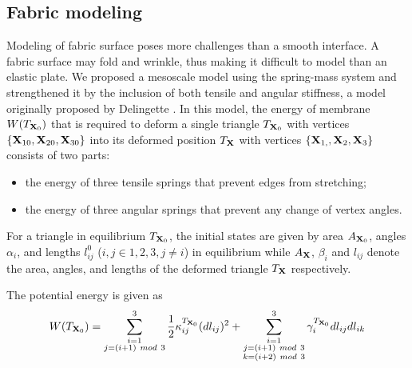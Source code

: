 \subsection{Fabric modeling} 
Modeling of fabric surface poses more challenges than
a smooth interface. A fabric surface may fold and wrinkle, thus making it
difficult to model than an elastic plate. We proposed a mesoscale model using
the spring-mass system and strengthened it by the inclusion of both tensile and
angular stiffness, a model originally proposed by Delingette \cite{Delinget2008}.
In this model, the energy of membrane $W(T_{\mathbf{X}_{0}})$ that is required to
deform a single triangle $T_{\mathbf{X}_{0}}$ with vertices
$\{\mathbf{X}_{10},\mathbf{X}_{20},\mathbf{X}_{30}\}$ into its deformed position
$T_{\mathbf{X}}$ with vertices $\{\mathbf{X}_{1,},\mathbf{X}_{2},\mathbf{X}_{3}\}$
consists of two parts: \begin{itemize} \item the energy of three tensile springs
that prevent edges from stretching; \item the energy of three angular springs
that prevent any change of vertex angles.  \end{itemize} For a triangle in
equilibrium $T_{\mathbf{X}_{0}}$, the initial states are given by area
$A_{\mathbf{X}_{0}}$, angles $\alpha_{i}$, and lengths $l_{ij}^{0}$
($i,j\in{1,2,3}, j\neq i$) in equilibrium while $A_{\mathbf{X}}$, $\beta_{i}$ and
$l_{ij}$ denote the area, angles, and lengths of the deformed triangle
$T_{\mathbf{X}}$ respectively.

The potential energy is given \cite{Delinget2008} as \[
W(T_{\vect{X}_{0}})=\sum_{\substack{i=1\\j=(i+1)\ mod\
3}}^{3}\frac{1}{2}\kappa_{ij}^{T_{\vect{X}_{0}}}
(dl_{ij})^{2}+\sum_{\substack{i=1\\j=(i+1)\ mod\ 3\\k=(i+2)\ mod\
3}}^{3}\gamma_{i}^{T_{\vect{X}_{0}}}dl_{ij}dl_{ik} \]

